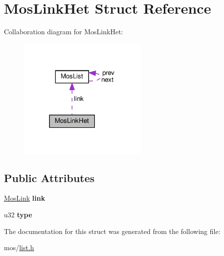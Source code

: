 \hypertarget{structMosLinkHet}{}\section{Mos\+Link\+Het Struct Reference}
\label{structMosLinkHet}


Collaboration diagram for Mos\+Link\+Het\+:\nopagebreak
\begin{figure}[H]
\begin{center}
\leavevmode
\includegraphics[width=180pt]{structMosLinkHet__coll__graph}
\end{center}
\end{figure}
\subsection*{Public Attributes}
\begin{DoxyCompactItemize}
\item 
\mbox{\label{structMosLinkHet_acb2e233a5da5848bd284575efd158f7a}} 
\hyperlink{structMosList}{Mos\+Link} {\bfseries link}
\item 
\mbox{\label{structMosLinkHet_a988c955f3fba0aef7681893203c37c0e}} 
u32 {\bfseries type}
\end{DoxyCompactItemize}


The documentation for this struct was generated from the following file\+:\begin{DoxyCompactItemize}
\item 
mos/\hyperlink{list_8h}{list.\+h}\end{DoxyCompactItemize}
